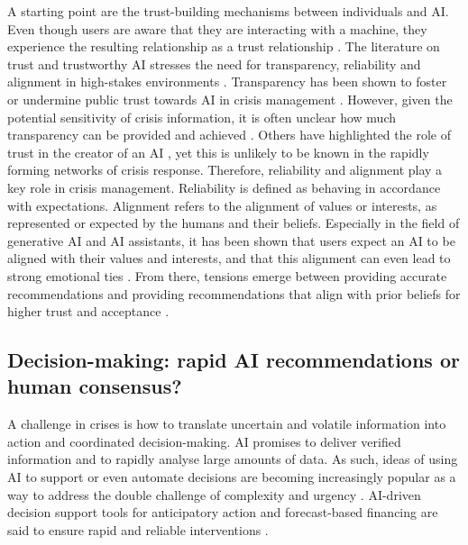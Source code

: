 \documentclass[sn-apacite]{sn-jnl}
\begin{document}
A starting point are the trust-building mechanisms between individuals and AI. Even though users are aware that they are interacting with a machine, they experience the resulting relationship as a trust relationship \citep{manzini2024should}. The literature on trust and trustworthy AI stresses the need for transparency, reliability and alignment in high-stakes environments \citep{glikson2020human,lee2004trust}. Transparency has been shown to foster or undermine public trust towards AI in crisis management \citep{steinbrink2024transparency,visave2025transparency}. However, given the potential sensitivity of crisis information, it is often unclear how much transparency can be provided and achieved \citep{steinbrink2024transparency}. Others have highlighted the role of trust in the creator of an AI \citep{saffarizadeh2024relationship}, yet this is unlikely to be known in the rapidly forming networks of crisis response. Therefore, reliability and alignment play a key role in crisis management. Reliability is defined as behaving in accordance with expectations. Alignment refers to the alignment of values or interests, as represented or expected by the humans and their beliefs. Especially in the field of generative AI and AI assistants, it has been shown that users expect an AI to be aligned with their values and interests, and that this alignment can even lead to strong emotional ties \citep{kaplan2023trust,manzini2024should}. From there, tensions emerge between providing accurate recommendations and providing recommendations that align with prior beliefs for higher trust and acceptance \citep{ekstrom2022self,sharma2024generative}.

\subsection{Decision-making: rapid AI recommendations or human consensus?}\label{sec:decision}

A challenge in crises is how to translate uncertain and volatile information into action and coordinated decision-making. AI promises to deliver verified information \citep{zhao2025tailoring} and to rapidly analyse large amounts of data. As such, ideas of using AI to support or even automate decisions are becoming increasingly popular as a way to address the double challenge of complexity and urgency \citep{comes2024ai}. AI-driven decision support tools for anticipatory action and forecast-based financing are said to ensure rapid and reliable interventions \citep{thalheimer2022role}. %
\end{document}
